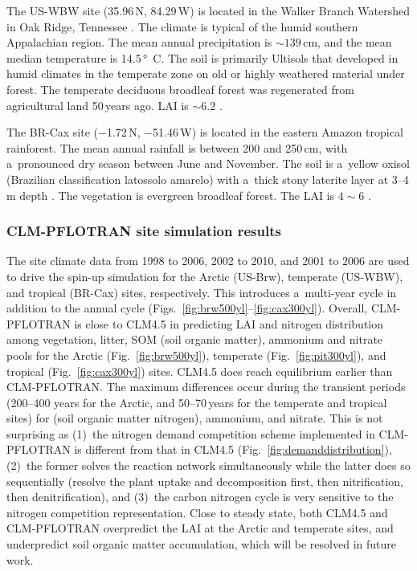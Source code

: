 \documentclass[gmdd, online, hvmath]{copernicus}
\begin{document}
      The US-WBW site (35.96{\degree}\,N, 84.29{\degree}\,W) is located in
      the Walker Branch Watershed in Oak Ridge, Tennessee
      \citep{Hanson2003}. The climate is typical of the humid southern
      Appalachian region. The mean annual precipitation is $\sim
      139$\,\unit{cm}, and the mean median temperature is
      14.5\,\unit{\degree C}.  The soil is primarily Ultisols that developed
      in humid climates in the temperate zone on old or highly weathered
      material under forest. The temperate deciduous broadleaf forest was
      regenerated from agricultural land 50\,years ago.  LAI is $\sim 6.2$
      \citep{Hanson2004}.

      The BR-Cax site ($-$1.72{\degree}\,N, $-$51.46{\degree}\,W) is located
      in the eastern Amazon tropical rainforest. The mean annual rainfall is
      between 200 and 250\,\unit{cm}, with a~pronounced dry season between
      June and November. The soil is a~yellow oxisol (Brazilian
      classification latossolo amarelo) with a~thick stony laterite layer at
      3--4\,m depth \citep{daCosta2010}. The vegetation is evergreen
      broadleaf forest. The LAI is $4 \sim 6$ \citep{Powell2013}.



\subsubsection{CLM-PFLOTRAN site simulation results}%

      The site climate data from 1998 to 2006, 2002 to 2010, and 2001 to
      2006 are used to drive the spin-up simulation for the Arctic (US-Brw),
      temperate (US-WBW), and tropical (BR-Cax) sites, respectively. This
      introduces a~multi-year cycle in addition to the annual cycle
      (Figs.~\ref{fig:brw500yl}--\ref{fig:cax300yl}). Overall, CLM-PFLOTRAN
      is close to CLM4.5 in predicting LAI and nitrogen distribution among
      vegetation, litter, SOM (soil organic matter), ammonium and nitrate
      pools for the Arctic (Fig.~\ref{fig:brw500yl}), temperate
      (Fig.~\ref{fig:pit300yl}), and tropical (Fig.~\ref{fig:cax300yl})
      sites. CLM4.5 does reach equilibrium earlier than CLM-PFLOTRAN. The
      maximum differences occur during the transient periods (200--400 years
      for the Arctic, and 50--70\,years for the temperate and tropical
      sites) for  (soil organic matter nitrogen), ammonium, and
      nitrate. This is not surprising as (1)~the nitrogen demand competition
      scheme implemented in CLM-PFLOTRAN is different from that in CLM4.5
      (Fig.~\ref{fig:demanddistribution}), (2)~the former solves the
      reaction network simultaneously while the latter does so sequentially
      (resolve the plant uptake and decomposition first, then nitrification,
      then denitrification), and (3)~the carbon nitrogen cycle is very
      sensitive to the nitrogen competition representation. Close to steady
      state, both CLM4.5 and CLM-PFLOTRAN overpredict the LAI at the Arctic
      and temperate sites, and underpredict soil organic matter
      accumulation, which will be resolved in future work.
\end{document}
